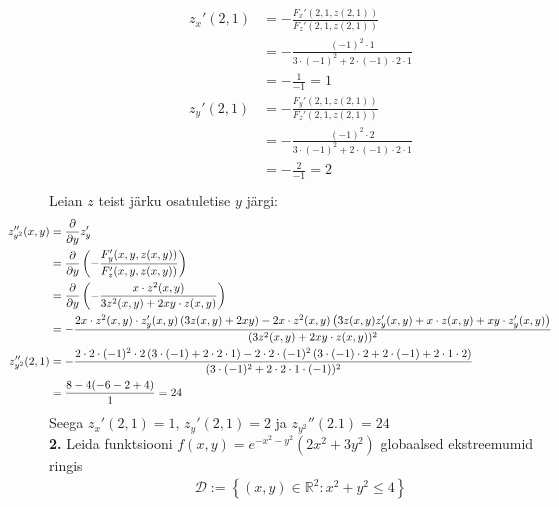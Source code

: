 \documentclass{article}
\newcommand{\p}[1]{\frac{\partial}{\partial #1}}
\begin{document}
\begin{gather*}
\begin{aligned}
z_x'(2,1)&=-\frac{F_x'(2,1,z(2,1))}{F_z'(2,1,z(2,1))}\\
&=-\frac{(-1)^2\cdot1}{3\cdot(-1)^2+2\cdot(-1)\cdot2\cdot1}\\
&=-\frac{1}{-1}=1\\
z_y'(2,1)&=-\frac{F_y'(2,1,z(2,1))}{F_z'(2,1,z(2,1))}\\
&=-\frac{(-1)^2\cdot2}{3\cdot(-1)^2+2\cdot(-1)\cdot2\cdot1}\\
&=-\frac{2}{-1}=2\\
\end{aligned}
\end{gather*}
Leian $z$ teist järku osatuletise $y$ järgi:
\begin{gather*}
\begin{aligned}
\hspace{-10\parindent}
z_{y^2}''(x,y)&=\p{y}z_y'\\
&=\p{y}\left(-\frac{F_y'(x,y,z(x,y))}{F_z'(x,y,z(x,y))}\right)\\
&=\p{y}\left(-\frac{x\cdot z^2(x,y)}{3z^2(x,y)+2xy\cdot z(x,y)}\right)\\
&=-\frac{2x\cdot z^2(x,y)\cdot z_y'(x,y)\left(3z(x,y)+2xy\right)-2x\cdot z^2(x,y)\left(3z(x,y)z_y'(x,y)+x\cdot z(x,y)+xy\cdot z_y'(x,y)\right)}{(3z^2(x,y)+2xy\cdot z(x,y))^2}\\
\hspace{-10\parindent}
z_{y^2}''(2,1)&=-\frac{2\cdot2\cdot (-1)^2\cdot 2\left(3\cdot(-1)+2\cdot2\cdot1\right)-2\cdot2\cdot (-1)^2\left(3\cdot(-1)\cdot2+2\cdot (-1)+2\cdot1\cdot 2\right)}{(3\cdot(-1)^2+2\cdot2\cdot1\cdot (-1))^2}\\
&=\frac{8-4(-6-2+4)}{1}=24
\end{aligned}
\end{gather*}
Seega $z_x'(2,1)=1$, $z_y'(2,1)=2$ ja $z_{y^2}''(2.1)=24$\pagebreak\\
\textbf{2.} Leida funktsiooni $f(x,y)=e^{-x^2-y^2}(2x^2+3y^2)$ globaalsed ekstreemumid ringis
\begin{gather*}
\mathcal{D}:=\left\{(x,y)\in\mathbb{R}^2:x^2+y^2\leq4\right\}
\end{gather*}
\end{document}

